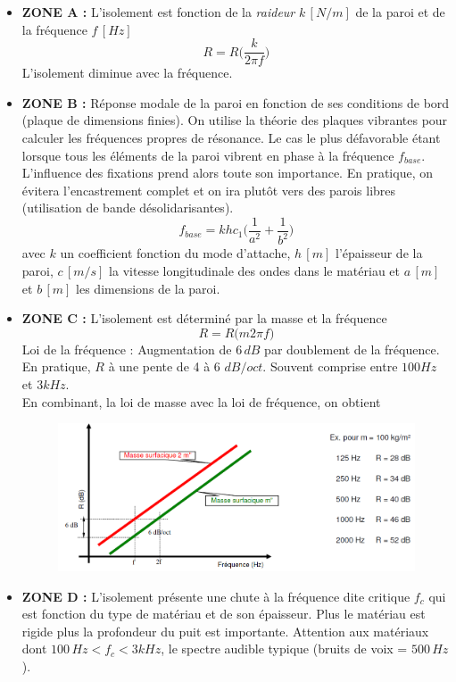 \documentclass[11pt]{report}
\begin{document}
\begin{itemize}
\item \textbf{ZONE A :} L'isolement est fonction de la \textit{raideur} $k\,[N/m]$ de la paroi et de la fréquence $f\,[Hz]$
$$R = R\Bigg(\frac{k}{2\pi f}\Bigg)$$
L'isolement diminue avec la fréquence.


\item \textbf{ZONE B :} Réponse modale de la paroi en fonction de ses conditions de bord (plaque de dimensions finies). On utilise la théorie des plaques vibrantes pour calculer les fréquences propres de résonance. Le cas le plus défavorable étant lorsque tous les éléments de la paroi vibrent en phase à la fréquence $f_{base}$. L'influence des fixations prend alors toute son importance. En pratique, on évitera l'encastrement complet et on ira plutôt vers des parois libres (utilisation de bande désolidarisantes).
$$f_{base} = k h c_1 \Bigg(\frac{1}{a^2}+\frac{1}{b^2}\Bigg)$$
avec $k$ un coefficient fonction du mode d'attache, $h\,[m]$ l'épaisseur de la paroi, $c\,[m/s]$ la vitesse longitudinale des ondes dans le matériau et  $a\,[m]$ et $b\,[m]$ les dimensions de la paroi.


\item \textbf{ZONE C :} L'isolement est déterminé par la masse et la fréquence 
$$R = R \Big(m 2\pi f\Big) $$
Loi de la fréquence : Augmentation de $6\,dB$ par doublement de la fréquence. En pratique, $R$ à une pente de 4 à 6 $dB/oct$. Souvent comprise entre $100Hz$ et $3kHz$.\\

En combinant, la loi de masse avec la loi de fréquence, on obtient
\begin{figure}[h]
\centering
\includegraphics[width=0.7\linewidth]{fre}
\end{figure}

\item \textbf{ZONE D :} L'isolement présente une chute à la fréquence dite critique $f_c$ qui est fonction du type de matériau et de son épaisseur. Plus le matériau est rigide plus la profondeur du puit est importante. Attention aux matériaux dont $100\,Hz < f_c < 3kHz$, le spectre audible typique (bruits de voix = $500\,Hz$).


\end{itemize}
\end{document}
